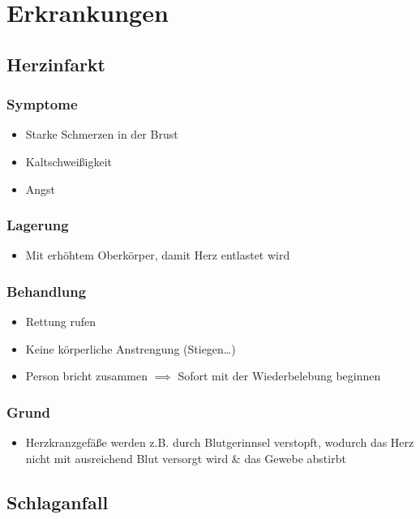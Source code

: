 \part{Erkrankungen}

\chapter{Herzinfarkt}
\section*{Symptome}
\begin{itemize}
    \item Starke Schmerzen in der Brust
    \item Kaltschweißigkeit
    \item Angst
\end{itemize}

\section*{Lagerung}
\begin{itemize}
    \item Mit erhöhtem Oberkörper, damit Herz entlastet wird
\end{itemize}

\section*{Behandlung}
\begin{itemize}
    \item Rettung rufen
    \item Keine körperliche Anstrengung (Stiegen\dots)
    \item Person bricht zusammen $\implies$ Sofort mit der Wiederbelebung beginnen
\end{itemize}

\section*{Grund}
\begin{itemize}
    \item Herzkranzgefäße werden z.B. durch Blutgerinnsel verstopft, wodurch das Herz nicht mit ausreichend Blut versorgt wird \& das Gewebe abstirbt
\end{itemize}

\chapter{Schlaganfall}
